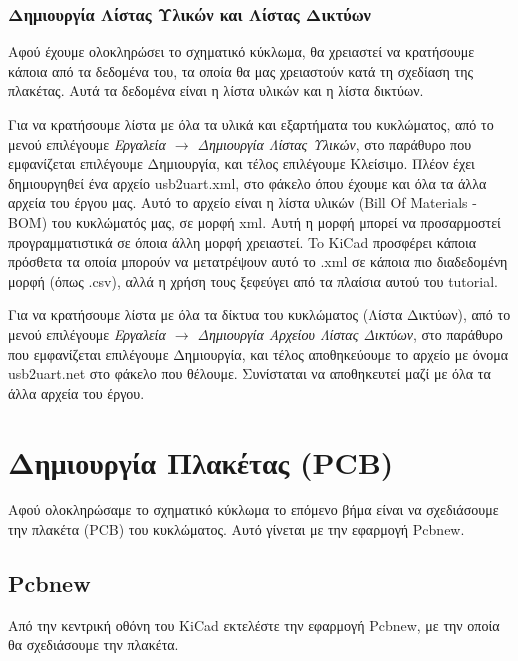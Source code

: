 \documentclass[a4paper]{article}
\begin{document}

\subsubsection{Δημιουργία Λίστας Υλικών και Λίστας Δικτύων}
Αφού έχουμε ολοκληρώσει το σχηματικό κύκλωμα, θα χρειαστεί να κρατήσουμε κάποια από τα δεδομένα του, τα οποία θα μας χρειαστούν κατά τη σχεδίαση της πλακέτας. Αυτά τα δεδομένα είναι η λίστα υλικών και η λίστα δικτύων.

Για να κρατήσουμε λίστα με όλα τα υλικά και εξαρτήματα του κυκλώματος, από το μενού επιλέγουμε \textit{Εργαλεία $\rightarrow$ Δημιουργία Λίστας Υλικών}, στο παράθυρο που εμφανίζεται επιλέγουμε Δημιουργία, και τέλος επιλέγουμε Κλείσιμο. Πλέον έχει δημιουργηθεί ένα αρχείο usb2uart.xml, στο φάκελο όπου έχουμε και όλα τα άλλα αρχεία του έργου μας. Αυτό το αρχείο είναι η λίστα υλικών (Bill Of Materials - BOM) του κυκλώματός μας, σε μορφή xml. Αυτή η μορφή μπορεί να προσαρμοστεί προγραμματιστικά σε όποια άλλη μορφή χρειαστεί. To KiCad προσφέρει κάποια πρόσθετα τα οποία μπορούν να μετατρέψουν αυτό το .xml σε κάποια πιο διαδεδομένη μορφή (όπως .csv), αλλά η χρήση τους ξεφεύγει από τα πλαίσια αυτού του tutorial.

Για να κρατήσουμε λίστα με όλα τα δίκτυα του κυκλώματος (Λίστα Δικτύων), από το μενού επιλέγουμε \textit{Εργαλεία $\rightarrow$ Δημιουργία Αρχείου Λίστας Δικτύων}, στο παράθυρο που εμφανίζεται επιλέγουμε Δημιουργία, και τέλος αποθηκεύουμε το αρχείο με όνομα usb2uart.net στο φάκελο που θέλουμε. Συνίσταται να αποθηκευτεί μαζί με όλα τα άλλα αρχεία του έργου.


\newpage
\section{Δημιουργία Πλακέτας (PCB)}
Αφού ολοκληρώσαμε το σχηματικό κύκλωμα το επόμενο βήμα είναι να σχεδιάσουμε την πλακέτα (PCB) του κυκλώματος. Αυτό γίνεται με την εφαρμογή Pcbnew.

\subsection{Pcbnew}
Από την κεντρική οθόνη του \textenglish{KiCad} εκτελέστε την εφαρμογή Pcbnew, με την οποία θα σχεδιάσουμε την πλακέτα.
\end{document}
